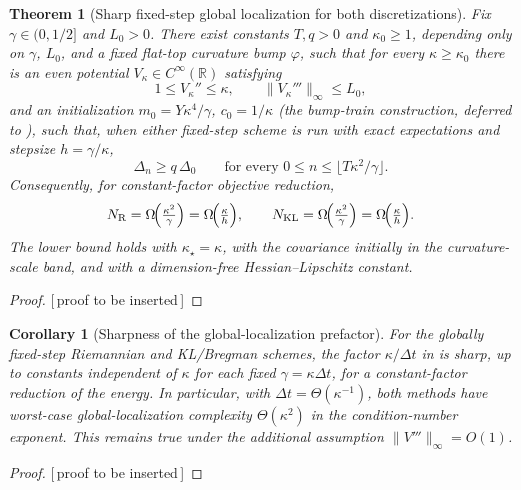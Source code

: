 \documentclass[11pt]{article}
\theoremstyle{plain}
\newtheorem{theorem}{Theorem}[section]
\newtheorem{corollary}[corollary]{Corollary}
\theoremstyle{definition}
\theoremstyle{remark}
\newcommand{\R}{\mathbb{R}}
\newcommand{\KL}{\mathrm{KL}}
\newcommand{\Riem}{\mathrm{R}}
\newcommand{\PROOFHOLE}{{\color{red}\textsf{[\,proof to be inserted\,]}}}
\newcommand{\kappastar}{\kappa_\star}
\begin{document}
\begin{theorem}[Sharp fixed-step global localization for both discretizations]
\label{thm:disc-global-sharp}
Fix $\gamma\in(0,1/2]$ and $L_0>0$. There exist constants $T,q>0$ and $\kappa_0\geq1$, depending only on
$\gamma$, $L_0$, and a fixed flat-top curvature bump $\varphi$, such that for every $\kappa\geq\kappa_0$
there is an even potential $V_\kappa\in C^\infty(\R)$ satisfying
\begin{equation}
\label{eq:disc-sharp-final-assumptions}
    1\leq V_\kappa''\leq\kappa,\qquad \|V_\kappa'''\|_\infty\leq L_0,
\end{equation}
and an initialization $m_0=Y\kappa^4/\gamma$, $c_0=1/\kappa$ (the bump-train construction, deferred to
), such that, when either fixed-step scheme is run with exact expectations and
stepsize $h=\gamma/\kappa$,
\begin{equation}
\label{eq:disc-sharp-final-gap}
    \Delta_n\geq q\,\Delta_0\qquad\text{for every }0\leq n\leq\bigl\lfloor T\kappa^2/\gamma\bigr\rfloor.
\end{equation}
Consequently, for constant-factor objective reduction,
\begin{equation}
\label{eq:disc-sharp-final-complexity}
    N_{\Riem}=\Omega\!\Bigl(\tfrac{\kappa^2}{\gamma}\Bigr)=\Omega\!\Bigl(\tfrac{\kappa}{h}\Bigr),\qquad
    N_{\KL}=\Omega\!\Bigl(\tfrac{\kappa^2}{\gamma}\Bigr)=\Omega\!\Bigl(\tfrac{\kappa}{h}\Bigr).
\end{equation}
The lower bound holds with $\kappastar=\kappa$, with the covariance initially in the curvature-scale
band, and with a dimension-free Hessian--Lipschitz constant.
\end{theorem}
\begin{proof}
\PROOFHOLE
\end{proof}

\begin{corollary}[Sharpness of the global-localization prefactor]
\label{cor:disc-global-sharp}
For the globally fixed-step Riemannian and KL/Bregman schemes, the factor $\kappa/\Delta t$ in
 is sharp, up to constants independent of $\kappa$ for each fixed
$\gamma=\kappa\Delta t$, for a constant-factor reduction of the energy. In particular, with
$\Delta t=\Theta(\kappa^{-1})$, both methods have worst-case global-localization complexity
$\Theta(\kappa^2)$ in the condition-number exponent. This remains true under the additional assumption
$\|V'''\|_\infty=O(1)$.
\end{corollary}
\begin{proof}
\PROOFHOLE
\end{proof}
\end{document}
